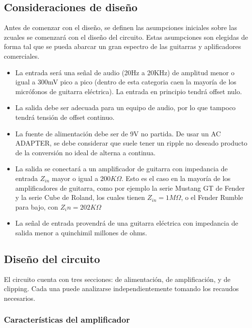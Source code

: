 \documentclass[../../main.tex]{subfiles}
\begin{document}
\subsection{Consideraciones de dise\~no} \label{ssec:ej5_consideraciones_disenio}
Antes de comenzar con el diseño, se definen las asumpciones iniciales sobre las zcuales se comenzará con el diseño del circuito. Estas asumpciones son elegidas de forma tal que se pueda abarcar un gran espectro de las guitarras y aplificadores comerciales.\par
\begin{itemize}
	\item La entrada ser\'a una señal de audio (20Hz a 20KHz) de amplitud menor o igual a 300mV pico a pico (dentro de esta categoria caen la mayor\'ia de los micr\'ofonos de guitarra el\'ectrica). La entrada en principio tendrá offset nulo.
	\item La salida debe ser adecuada para un equipo de audio, por lo que tampoco tendrá tensión de offset continuo.
	\item La fuente de alimentaci\'on debe ser de 9V no partida. De usar un AC ADAPTER, se debe considerar que suele tener un ripple no deseado producto de la conversi\'on no ideal de alterna a continua.
	\item La salida se conectar\'a a un amplificador de guitarra con impedancia de entrada $Z_{in}$ mayor o igual a $200K\Omega$. Esto es el caso en la mayor\'ia de los amplificadores de guitarra, como por ejemplo la serie Mustang GT de Fender y la serie Cube de Roland, los cuales tienen $Z_{in} = 1M\Omega$, o el Fender Rumble para bajo, con $Z_in = 202K\Omega$ 
	\item La se\~nal de entrada provendr\'a de una guitarra el\'ectrica con impedancia de salida menor a quinchimil millones de ohms.	
\end{itemize}


\subsection{Dise\~no del circuito}
El circuito cuenta con tres secciones: de alimentaci\'on, de amplificaci\'on, y de clipping. Cada una puede analizarse independientemente tomando los recaudos necesarios.

\subsubsection{Caracter\'isticas del amplificador}
\end{document}
